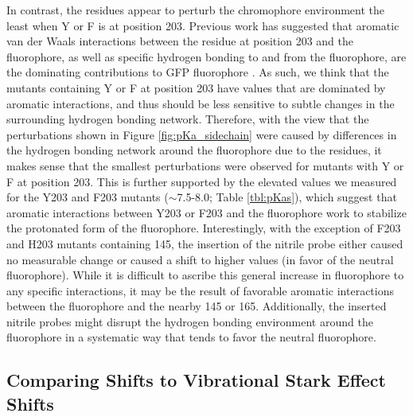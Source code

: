 In contrast, the \pCNF{} residues appear to perturb the chromophore environment the least when Y or F is at position 203.
Previous work has suggested that aromatic van der Waals interactions between the residue at position 203 and the fluorophore, as well as specific hydrogen bonding to and from the fluorophore, are the dominating contributions to GFP fluorophore \pKa{} \cite{Elsliger1999}.
As such, we think that the mutants containing Y or F at position 203 have \pKa{} values that are dominated by aromatic interactions, and thus should be less sensitive to subtle changes in the surrounding hydrogen bonding network.
Therefore, with the view that the perturbations shown in Figure \ref{fig:pKa_sidechain} were caused by differences in the hydrogen bonding network around the fluorophore due to the \pCNF{} residues, it makes sense that the smallest perturbations were observed for mutants with Y or F at position 203.
This is further supported by the elevated \pKa{} values we measured for the Y203 and F203 mutants ($\sim$7.5-8.0; Table \ref{tbl:pKas}), which suggest that aromatic interactions between Y203 or F203 and the fluorophore work to stabilize the protonated form of the fluorophore.
Interestingly, with the exception of F203 and H203 mutants containing \pCNF{} 145, the insertion of the nitrile probe either caused no measurable \pKa{} change or caused a shift to higher \pKa{} values (in favor of the neutral fluorophore).
While it is difficult to ascribe this general increase in fluorophore \pKa{} to any specific interactions, it may be the result of favorable aromatic interactions between the fluorophore and the nearby \pCNF{} 145 or 165.
Additionally, the inserted nitrile probes might disrupt the hydrogen bonding environment around the fluorophore in a systematic way that tends to favor the neutral fluorophore. 

\subsection{Comparing \pKa{} Shifts to Vibrational Stark Effect Shifts}


